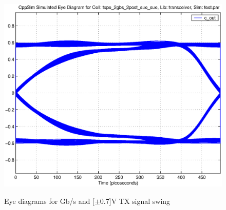 \begin{figure}[H]
  {\includegraphics[scale=0.5]{eyes/eye_2gbs_2post.eps}}
  \caption{Eye diagrams for \unit[2]{Gb/s} and \unit[$\pm$0.7]{V} TX signal swing}
  \label{fig:eyes_2gbs}
\end{figure}